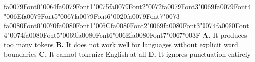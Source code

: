 \documentclass[11pt]{article}
\begin{document}
\begin{enumerate}[leftmargin=*]
{\csname fa0079Font0\endcsname\char"0064}{\csname fa0079Font1\endcsname\char"0075}{\csname fa0079Font2\endcsname\char"0072}{\csname fa0079Font3\endcsname\char"0069}{\csname fa0079Font4\endcsname\char"006E}{\csname fa0079Font5\endcsname\char"0067}{\csname fa0079Font6\endcsname\char"0020}{\csname fa0079Font7\endcsname\char"0073} {\csname fa0080Font0\endcsname\char"0070}{\csname fa0080Font1\endcsname\char"006C}{\csname fa0080Font2\endcsname\char"0069}{\csname fa0080Font3\endcsname\char"0074}{\csname fa0080Font4\endcsname\char"0074}{\csname fa0080Font5\endcsname\char"0069}{\csname fa0080Font6\endcsname\char"006E}{\csname fa0080Font7\endcsname\char"0067}{\char"003F}
    \textbf{A.} It produces too many tokens
    \textbf{B.} It does not work well for languages without explicit word boundaries
    \textbf{C.} It cannot tokenize English at all
    \textbf{D.} It ignores punctuation entirely


\end{enumerate}
\end{document}

